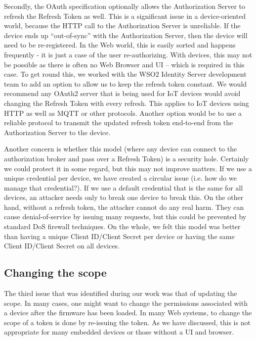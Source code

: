 \documentclass{IEEEtran}
\begin{document}
Secondly, the OAuth specification optionally allows the Authorization Server to refresh the Refresh Token as well. 
This is a significant issue in a device-oriented world, because the HTTP call to the Authorization Server is unreliable.
If the device ends up ``out-of-sync'' with the Authorization Server, then the device will need to be re-registered.  In the Web world, this is easily sorted and happens
frequently - it is just a case of the user re-authorizing. 
With devices, this may not be possible as there is often no Web Browser and UI -- which is required in this case.
To get round this, we worked with the WSO2 Identity Server development team
to add an option to allow us to keep the refresh token constant. We would recommend any OAuth2 server that is being used for IoT devices would avoid changing the 
Refresh Token with every refresh. This applies to IoT devices using HTTP as well as MQTT or other protocols. Another option would be to use a reliable protocol to transmit the updated refresh token end-to-end from the Authorization Server to the device.

Another concern is whether this model (where any device can connect to the authorization broker and pass over a Refresh Token) is a security
hole. Certainly we could protect it in some regard, but this may not improve matters. If we use a unique credential per device, we have created a circular issue (i.e. how do we manage that credential?). 
If we use a default credential that is the same for all devices, an attacker needs only to break one device to break this.
On the other hand, without a refresh token, the attacker cannot do any real harm. They can cause denial-of-service by issuing 
many requests, but this could be prevented by standard DoS firewall techniques. On the whole, we felt this model was better than 
having a unique Client ID/Client Secret per device or having the same Client ID/Client Secret on all devices.

\subsection{Changing the scope}
The third issue that was identified during our work was that of updating the scope.
In many cases, one might want to change the permissions associated with a device after the firmware
has been loaded. In many Web systems, to change the scope of a token is done by re-issuing the token. As we have discussed, this is not appropriate for many embedded devices or those without a UI and browser. 
\end{document}
